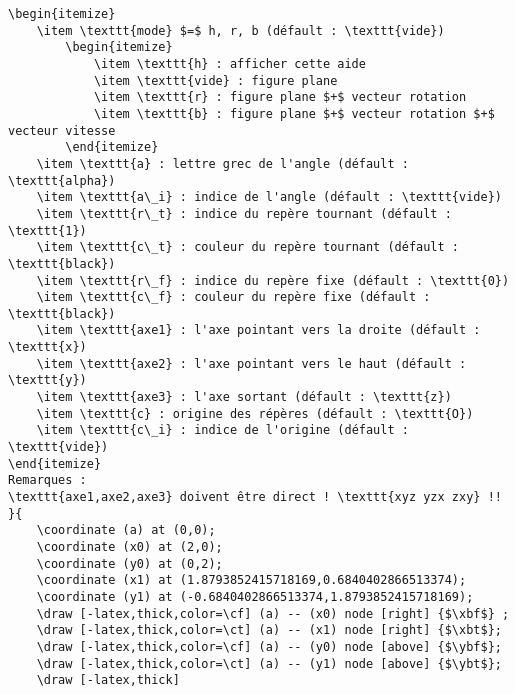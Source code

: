 \documentclass[a4paper,9pt]{article}
\begin{document}
\begin{verbatim}
\begin{itemize}
    \item \texttt{mode} $=$ h, r, b (défault : \texttt{vide})
        \begin{itemize}
            \item \texttt{h} : afficher cette aide
            \item \texttt{vide} : figure plane
            \item \texttt{r} : figure plane $+$ vecteur rotation
            \item \texttt{b} : figure plane $+$ vecteur rotation $+$ vecteur vitesse
        \end{itemize}
    \item \texttt{a} : lettre grec de l'angle (défault : \texttt{alpha})
    \item \texttt{a\_i} : indice de l'angle (défault : \texttt{vide})
    \item \texttt{r\_t} : indice du repère tournant (défault : \texttt{1})
    \item \texttt{c\_t} : couleur du repère tournant (défault : \texttt{black})
    \item \texttt{r\_f} : indice du repère fixe (défault : \texttt{0})
    \item \texttt{c\_f} : couleur du repère fixe (défault : \texttt{black})
    \item \texttt{axe1} : l'axe pointant vers la droite (défault : \texttt{x})
    \item \texttt{axe2} : l'axe pointant vers le haut (défault : \texttt{y})
    \item \texttt{axe3} : l'axe sortant (défault : \texttt{z})
    \item \texttt{c} : origine des répères (défault : \texttt{O})
    \item \texttt{c\_i} : indice de l'origine (défault : \texttt{vide})
\end{itemize}
Remarques : 
\texttt{axe1,axe2,axe3} doivent être direct ! \texttt{xyz yzx zxy} !!
}{
    \coordinate (a) at (0,0);
    \coordinate (x0) at (2,0);
    \coordinate (y0) at (0,2);
    \coordinate (x1) at (1.8793852415718169,0.6840402866513374);
    \coordinate (y1) at (-0.6840402866513374,1.8793852415718169);
    \draw [-latex,thick,color=\cf] (a) -- (x0) node [right] {$\xbf$} ;
    \draw [-latex,thick,color=\ct] (a) -- (x1) node [right] {$\xbt$};
    \draw [-latex,thick,color=\cf] (a) -- (y0) node [above] {$\ybf$};
    \draw [-latex,thick,color=\ct] (a) -- (y1) node [above] {$\ybt$};
    \draw [-latex,thick] 

\end{verbatim}
\end{document}
